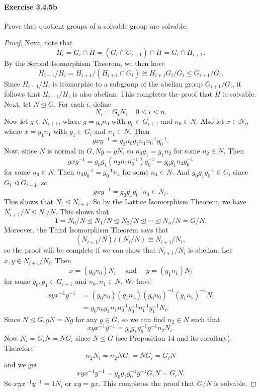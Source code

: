 \documentclass{article}
\theoremstyle{definition}
\begin{document}
\paragraph{Exercise 3.4.5b} Prove that quotient groups of a solvable group are solvable.
\begin{proof}
    Next, note that
$$
H_i=G_i \cap H=\left(G_i \cap G_{i+1}\right) \cap H=G_i \cap H_{i+1} .
$$
By the Second Isomorphism Theorem, we then have
$$
H_{i+1} / H_i=H_{i+1} /\left(H_{i+1} \cap G_i\right) \cong H_{i+1} G_i / G_i \leq G_{i+1} / G_i .
$$
Since $H_{i+1} / H_i$ is isomorphic to a subgroup of the abelian group $G_{i+1} / G_i$, it follows that $H_{i+1} / H_i$ is also abelian. This completes the proof that $H$ is solvable.
Next, let $N \unlhd G$. For each $i$, define
$$
N_i=G_i N, \quad 0 \leq i \leq n .
$$
Now let $g \in N_{i+1}$, where $g=g_0 n_0$ with $g_0 \in G_{i+1}$ and $n_0 \in N$. Also let $x \in N_i$, where $x=g_1 n_1$ with $g_1 \in G_i$ and $n_1 \in N$. Then
$$
g x g^{-1}=g_0 n_0 g_1 n_1 n_0^{-1} g_0^{-1} .
$$
Now, since $N$ is normal in $G, N g=g N$, so $n_0 g_1=g_1 n_2$ for some $n_2 \in N$. Then
$$
g x g^{-1}=g_0 g_1\left(n_2 n_1 n_0^{-1}\right) g_0^{-1}=g_0 g_1 n_3 g_0^{-1}
$$
for some $n_3 \in N$. Then $n_3 g_0^{-1}=g_0^{-1} n_4$ for some $n_4 \in N$. And $g_0 g_1 g_0^{-1} \in G_i$ since $G_i \unlhd G_{i+1}$, so
$$
g x g^{-1}=g_0 g_1 g_0^{-1} n_4 \in N_i .
$$
This shows that $N_i \unlhd N_{i+1}$. So by the Lattice Isomorphism Theorem, we have $N_{i+1} / N \unlhd N_i / N$. This shows that
$$
1=N_0 / N \unlhd N_1 / N \unlhd N_2 / N \unlhd \cdots \unlhd N_n / N=G / N .
$$
Moreover, the Third Isomorphism Theorem says that
$$
\left(N_{i+1} / N\right) /\left(N_i / N\right) \cong N_{i+1} / N_i,
$$
so the proof will be complete if we can show that $N_{i+1} / N_i$ is abelian.
Let $x, y \in N_{i+1} / N_i$. Then
$$
x=\left(g_0 n_0\right) N_i \quad \text { and } \quad y=\left(g_1 n_1\right) N_i
$$
for some $g_0, g_1 \in G_{i+1}$ and $n_0, n_1 \in N$. We have
$$
\begin{aligned}
x y x^{-1} y^{-1} & =\left(g_0 n_0\right)\left(g_1 n_1\right)\left(g_0 n_0\right)^{-1}\left(g_1 n_1\right)^{-1} N_i \\
& =g_0 n_0 g_1 n_1 n_0^{-1} g_0^{-1} n_1^{-1} g_1^{-1} N_i .
\end{aligned}
$$
Since $N \unlhd G, g N=N g$ for any $g \in G$, so we can find $n_2 \in N$ such that
$$
x y x^{-1} y^{-1}=g_0 g_1 g_0^{-1} g^{-1} n_2 N_i .
$$
Now $N_i=G_i N=N G_i$ since $N \unlhd G$ (see Proposition 14 and its corollary). Therefore
$$
n_2 N_i=n_2 N G_i=N G_i=G_i N
$$
and we get
$$
x y x^{-1} y^{-1}=g_0 g_1 g_0^{-1} g^{-1} G_i N=G_i N .
$$
So $x y x^{-1} y^{-1}=1 N_i$ or $x y=y x$. This completes the proof that $G / N$ is solvable.
\end{proof}
\end{document}
